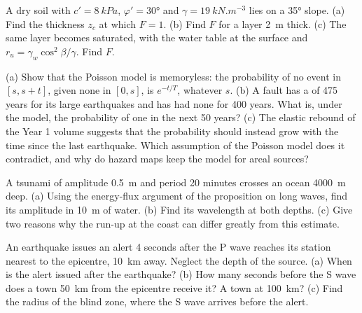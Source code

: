 \begin{exercise}[$\star\star$]\label{exo:b2:geological-hazards:9}
A dry soil with $c' = \qty{8}{kPa}$, $\varphi' = \ang{30}$ and $\gamma = \qty{19}{kN.m^{-3}}$ lies on
a \ang{35} slope. (a) Find the thickness $z_c$ at which $F = 1$. (b) Find $F$ for a layer
\qty{2}{m} thick. (c) The same layer becomes saturated, with the water table at the surface and
$r_u = \gamma_w\cos^2\beta/\gamma$. Find $F$.
\end{exercise}

\begin{exercise}[$\star\star\star$]\label{exo:b2:geological-hazards:10}
(a) Show that the Poisson model is memoryless: the probability of no event in $[s, s + t]$, given
none in $[0, s]$, is $e^{-t/T}$, whatever $s$. (b) A fault has a  of 475 years for its
large earthquakes and has had none for 400 years. What is, under the model, the probability of one
in the next 50 years? (c) The elastic rebound of the Year 1 volume suggests that the probability
should instead grow with the time since the last earthquake. Which assumption of the Poisson model
does it contradict, and why do hazard maps keep the model for areal sources?
\end{exercise}

\begin{exercise}[$\star\star\star$]\label{exo:b2:geological-hazards:11}
A tsunami of amplitude \qty{0.5}{m} and period 20 minutes crosses an ocean \qty{4000}{m} deep. (a)
Using the energy-flux argument of the proposition on long waves, find its amplitude in \qty{10}{m}
of water. (b) Find its wavelength at both depths. (c) Give two reasons why the run-up at the coast
can differ greatly from this estimate.
\end{exercise}

\begin{exercise}[$\star\star\star$]\label{exo:b2:geological-hazards:12}
An earthquake  issues an alert 4 seconds after the P wave reaches its station
nearest to the epicentre, \qty{10}{km} away. Neglect the depth of the source. (a) When is the
alert issued after the earthquake? (b) How many seconds before the S wave does a town \qty{50}{km}
from the epicentre receive it? A town at \qty{100}{km}? (c) Find the radius of the blind zone, where
the S wave arrives before the alert.
\end{exercise}

